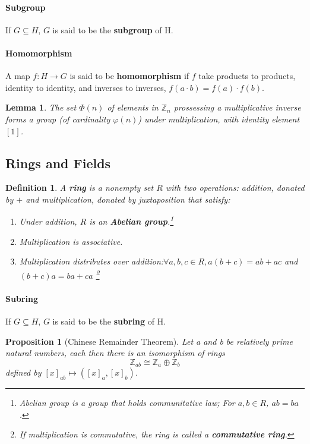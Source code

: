 \documentclass[12pt]{article}
\newtheorem{definition}{Definition}[subsection]
\newtheorem{proposition}{Proposition}[subsection]
\newtheorem{lemma}{Lemma}[subsection]
\begin{document}
\paragraph{Subgroup} If $G \subseteq H$, $G$ is said to be the \textbf{subgroup} of H.

\paragraph{Homomorphism} A map $f: H\rightarrow G$ is said to be \textbf{homomorphism} if $f$ take products to products, identity to identity, and inverses to inverses, $f(a\cdot b)=f(a)\cdot f(b)$.

\begin{lemma}
    The set $\Phi(n)$ of elements in $\mathbb{Z}_n$ prossessing a multiplicative inverse forms a group (of cardinality $\varphi(n)$) under multiplication, with identity element $[1]$.
\end{lemma}

\subsection{Rings and Fields}

\begin{definition}
    A \textbf{ring} is a nonempty set $R$ with two operations: addition, donated by $+$ and multiplication, donated by juxtaposition that satisfy:
    \begin{enumerate}
        \item Under addition, $R$ is an \textbf{Abelian group}.\footnote{Abelian group is a group that holds communitative law; For $a, b \in R$, $ab = ba$.}
        \item Multiplication is associative.
        \item Multiplication distributes over addition:$\forall a,b,c\in R, a(b+c) = ab+ac$ and $(b+c)a = ba+ca$ \footnote{If multiplication is commutative, the ring is called a \textbf{commutative ring}.}

    \end{enumerate}
   \end{definition}

\paragraph{Subring} If $G \subseteq H$, $G$ is said to be the \textbf{subring} of H.

\begin{proposition}[Chinese Remainder Theorem]
    Let a and b be relatively prime natural numbers, each then there is an isomorphism of rings
    \begin{equation}
        \mathbb{Z}_{ab} \cong \mathbb{Z}_a \oplus \mathbb{Z}_b
    \end{equation}
    defined by $[x]_{ab} \mapsto ([x]_a, [x]_b)$.
\end{proposition}
\end{document}
